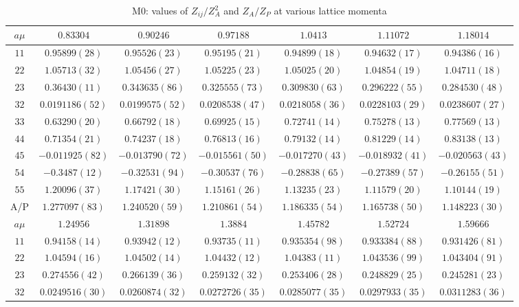 \begin{table}
\begin{center}
\caption{M0: values of $Z_{ij}/Z_A^2$ and $Z_A/Z_P$ at various lattice momenta}
\begin{tabular}{c|c c c c c c}
\hline
\hline
$a\mu$ & $0.83304$ & $0.90246$ & $0.97188$ & $1.0413$ & $1.11072$ & $1.18014$ \\
\hline
$11$ & $0.95899(28)$ & $0.95526(23)$ & $0.95195(21)$ & $0.94899(18)$ & $0.94632(17)$ & $0.94386(16)$ \\
$22$ & $1.05713(32)$ & $1.05456(27)$ & $1.05225(23)$ & $1.05025(20)$ & $1.04854(19)$ & $1.04711(18)$ \\
$23$ & $0.36430(11)$ & $0.343635(86)$ & $0.325555(73)$ & $0.309830(63)$ & $0.296222(55)$ & $0.284530(48)$ \\
$32$ & $0.0191186(52)$ & $0.0199575(52)$ & $0.0208538(47)$ & $0.0218058(36)$ & $0.0228103(29)$ & $0.0238607(27)$ \\
$33$ & $0.63290(20)$ & $0.66792(18)$ & $0.69925(15)$ & $0.72741(14)$ & $0.75278(13)$ & $0.77569(13)$ \\
$44$ & $0.71354(21)$ & $0.74237(18)$ & $0.76813(16)$ & $0.79132(14)$ & $0.81229(14)$ & $0.83138(13)$ \\
$45$ & $-0.011925(82)$ & $-0.013790(72)$ & $-0.015561(50)$ & $-0.017270(43)$ & $-0.018932(41)$ & $-0.020563(43)$ \\
$54$ & $-0.3487(12)$ & $-0.32531(94)$ & $-0.30537(76)$ & $-0.28838(65)$ & $-0.27389(57)$ & $-0.26155(51)$ \\
$55$ & $1.20096(37)$ & $1.17421(30)$ & $1.15161(26)$ & $1.13235(23)$ & $1.11579(20)$ & $1.10144(19)$ \\
\hline
A/P & $1.277097(83)$ & $1.240520(59)$ & $1.210861(54)$ & $1.186335(54)$ & $1.165738(50)$ & $1.148223(30)$ \\
\hline
$a\mu$ & $1.24956$ & $1.31898$ & $1.3884$ & $1.45782$ & $1.52724$ & $1.59666$ \\
\hline
$11$ & $0.94158(14)$ & $0.93942(12)$ & $0.93735(11)$ & $0.935354(98)$ & $0.933384(88)$ & $0.931426(81)$ \\
$22$ & $1.04594(16)$ & $1.04502(14)$ & $1.04432(12)$ & $1.04383(11)$ & $1.043536(99)$ & $1.043404(91)$ \\
$23$ & $0.274556(42)$ & $0.266139(36)$ & $0.259132(32)$ & $0.253406(28)$ & $0.248829(25)$ & $0.245281(23)$ \\
$32$ & $0.0249516(30)$ & $0.0260874(32)$ & $0.0272726(35)$ & $0.0285077(35)$ & $0.0297933(35)$ & $0.0311283(36)$ \\

\end{tabular}
\end{center}
\end{table}
